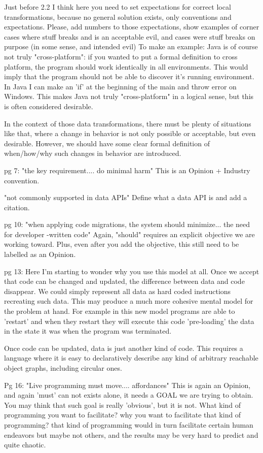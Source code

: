 Just before 2.2 I think here you need to set expectations for correct local transformations, because no general solution exists, only conventions and expectations. Please, add numbers to those expectations, show examples of corner cases where stuff breaks and is an acceptable evil, and cases were stuff breaks on purpose (in some sense, and intended evil) To make an example: Java is of course not truly "cross-platform": if you wanted to put a formal definition to cross platform, the program should work identically in all environments. This would imply that the program should not be able to discover it's running environment. In Java I can make an 'if' at the beginning of the main and throw error on Windows. This makes Java not truly "cross-platform" in a logical sense, but this is often considered desirable.

In the context of those data transformations, there must be plenty of situations like that, where a change in behavior is not only possible or acceptable, but even desirable. However, we should have some clear formal definition of when/how/why such changes in behavior are introduced.

pg 7: "the key requirement.... do minimal harm" This is an Opinion + Industry convention.

"not commonly supported in data APIs" Define what a data API is and add a citation.

pg 10: "when applying code migrations, the system should minimize... the need for developer -written code" Again, "should" requires an explicit objective we are working toward. Plus, even after you add the objective, this still need to be labelled as an Opinion.

pg 13: Here I'm starting to wonder why you use this model at all. Once we accept that code can be changed and updated, the difference between data and code disappear. We could simply represent all data as hard coded instructions recreating such data. This may produce a much more cohesive mental model for the problem at hand. For example in this new model programs are able to 'restart' and when they restart they will execute this code 'pre-loading' the data in the state it was when the program was terminated.

Once code can be updated, data is just another kind of code. This requires a language where it is easy to declaratively describe any kind of arbitrary reachable object graphs, including circular ones.

Pg 16: "Live programming must move.... affordances" This is again an Opinion, and again 'must' can not exists alone, it needs a GOAL we are trying to obtain. You may think that such goal is really 'obvious', but it is not. What kind of programming you want to facilitate? why you want to facilitate that kind of programming? that kind of programming would in turn facilitate certain human endeavors but maybe not others, and the results may be very hard to predict and quite chaotic.


